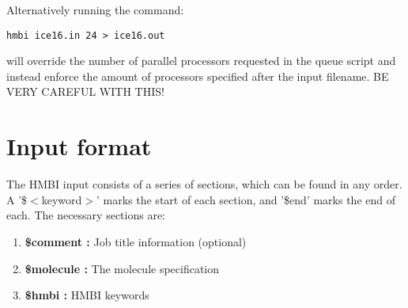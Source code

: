 \documentclass[11pt,letterpaper]{article}
\begin{document}
\begin{spacing}{1.0}
Alternatively running the command:
\begin{verbatim}
hmbi ice16.in 24 > ice16.out
\end{verbatim}
will override the number of parallel processors requested in the queue script and instead enforce the amount of processors specified after the input filename. {\color{red} BE VERY CAREFUL WITH THIS!}

\section{Input format}

The HMBI input consists of a series of sections, which can be found in 
any order. A '\$$<$keyword$>$' marks the start of each section, and '\$end' 
marks the end of each.  The necessary sections are:

\begin{enumerate}
\item {\bf \$comment :} Job title information (optional)

\item {\bf \$molecule :} The molecule specification

\item {\bf \$hmbi :} HMBI keywords


\end{enumerate}
\end{spacing}
\end{document}
